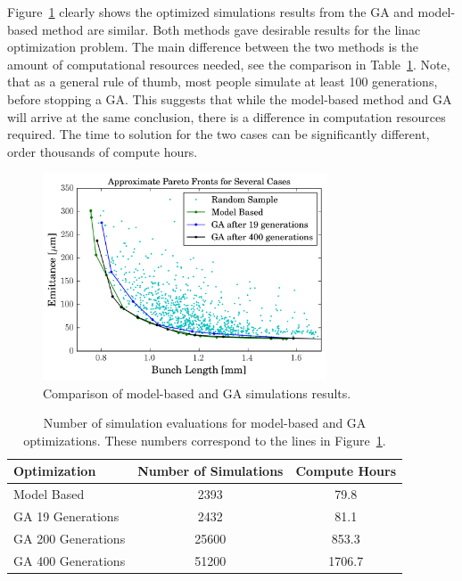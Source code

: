 Figure~\ref{fig:GAvsModel} clearly shows the optimized simulations results from 
the GA and model-based method are similar. Both methods gave desirable 
results for the linac optimization problem. 
The main difference between the two methods is the amount of computational 
resources needed, see the comparison in Table~\ref{tab:optcompare}.
Note, that as a general rule of thumb, most people simulate at least 100 generations, before stopping a GA.
This suggests that while the model-based method and GA will arrive at 
the same conclusion, there is a difference in computation resources required. 
The time to solution for the two cases can be significantly different, 
order thousands of compute hours.
\begin{figure}
	\centering
	\includegraphics[width=0.75\textwidth]{./images/model_vs_ga}
	\caption{Comparison of model-based and GA simulations results.}
	\label{fig:GAvsModel}
\end{figure}
\begin{table}%
	\caption{Number of simulation evaluations for model-based and GA optimizations.
	These numbers correspond to the lines in Figure~\ref{fig:GAvsModel}.}
	\label{tab:optcompare}
	\begin{center}
		\begin{tabular}{lcc}
			\toprule
			\toprule
			\textbf{Optimization} & \textbf{Number of Simulations} & \textbf{Compute Hours} \\
			\midrule
			Model Based  		& 2393  & 79.8 \\
			GA 19 Generations 	& 2432  & 81.1 \\
			GA 200 Generations 	& 25600 & 853.3\\
			GA 400 Generations 	& 51200 & 1706.7\\
			\bottomrule
		\end{tabular}
	\end{center}
\end{table}


